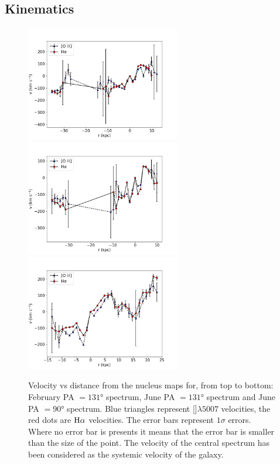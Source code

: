 \documentclass[../thesis.tex]{subfiles}
\begin{document}
\subsection{Kinematics}
\label{sec:pap3_kinematics}

\begin{figure}
\centering
\includegraphics[width=0.6\textwidth]{images/paper3/PA131_2016_velocity.jpg}\\ 
\includegraphics[width=0.6\textwidth]{images/paper3/PA131_velocity.jpg}\\ 
\includegraphics[width=0.6\textwidth]{images/paper3/PA90_velocity.jpg}\\ 
\caption[]{Velocity vs distance from the nucleus maps for, from top to bottom: February PA $=\ang{131}$ spectrum, June PA $=\ang{131}$ spectrum and June PA $=\ang{90}$ spectrum. Blue triangles represent []$\lambda5007$ velocities, the red dots are $\rm H\alpha$ velocities.
The error bars represent $1\sigma$ errors. Where no error bar is presents it means that the error bar is smaller than the size of the point. The velocity of the central spectrum has been considered as the systemic velocity of the galaxy.} 
\label{fig:velocity_lines}
\end{figure} 
\end{document}
